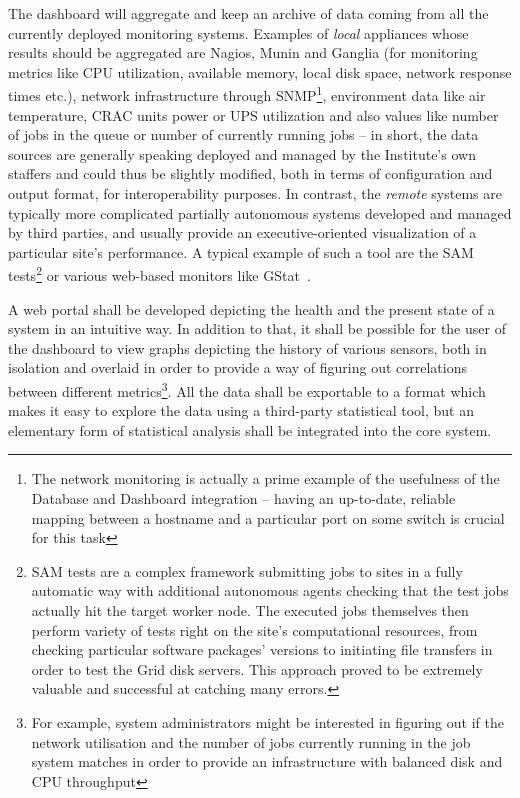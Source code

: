 \documentclass[12pt]{article}
\begin{document}
The dashboard will aggregate and keep an archive of data coming from all the currently deployed monitoring systems.  Examples of
{\em local} appliances whose results should be aggregated are Nagios, Munin and Ganglia (for monitoring metrics like CPU
utilization, available memory, local disk space, network response times etc.), network infrastructure through
SNMP\footnote{The network monitoring is actually a prime example of the usefulness of the Database and Dashboard integration --
having an up-to-date, reliable mapping between a hostname and a particular port on some switch is crucial for this task},
environment data like air temperature, CRAC units power or UPS utilization and also values like number of jobs in the queue or
number of currently running jobs -- in short, the data sources are generally speaking deployed and managed by the Institute's own
staffers and could thus be slightly modified, both in terms of configuration and output format, for interoperability purposes.  In
contrast, the {\em remote} systems are typically more complicated partially autonomous systems developed and managed by third
parties, and usually provide an executive-oriented visualization of a particular site's performance.  A typical example of such a
tool are the SAM tests\footnote{SAM tests are a complex framework submitting jobs to sites in a fully automatic way with additional
autonomous agents checking that the test jobs actually hit the target worker node.  The executed jobs themselves then perform
variety of tests right on the site's computational resources, from checking particular software packages' versions to initiating
file transfers in order to test the Grid disk servers.  This approach proved to be extremely valuable and successful at catching
many errors.} or various web-based monitors like GStat~\cite{gstat}.

A web portal
shall be developed depicting the health and the present state of a system in an intuitive way.  In addition to that, it shall be
possible for the user of the dashboard to view graphs depicting the history of various sensors, both in isolation and overlaid in
order to provide a way of figuring out correlations between different metrics\footnote{For example, system administrators might be
interested in figuring out if the network utilisation and the number of jobs currently running in the job system matches in order
to provide an infrastructure with balanced disk and CPU throughput}.  All the data shall be exportable to a format which makes it
easy to explore the data using a third-party statistical tool, but an elementary form of statistical analysis shall be integrated
into the core system.
\end{document}

